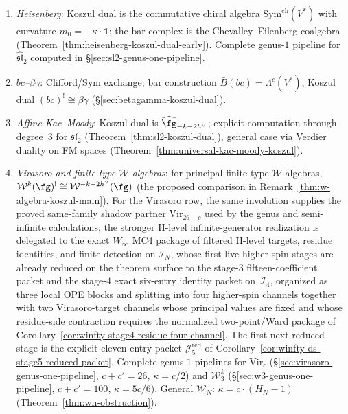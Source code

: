 \begin{enumerate}[label=(\roman*)]
\item \emph{Heisenberg}: Koszul dual is the commutative chiral algebra
$\mathrm{Sym}^{\mathrm{ch}}(V^*)$ with curvature $m_0 = -\kappa \cdot \mathbf{1}$;
the bar complex is the Chevalley--Eilenberg coalgebra
(Theorem~\ref{thm:heisenberg-koszul-dual-early}).
Complete genus-$1$ pipeline for $\widehat{\mathfrak{sl}}_2$ computed
in \S\ref{sec:sl2-genus-one-pipeline}.
\item \emph{$bc$--$\beta\gamma$}: Clifford/Sym exchange;
bar construction $\bar{B}(bc) = \Lambda^c(V^*)$, Koszul dual
$(bc)^! \cong \beta\gamma$
(\S\ref{sec:betagamma-koszul-dual}).
\item \emph{Affine Kac--Moody}: Koszul dual is
$\widehat{\fg}_{-k-2h^\vee}$; explicit computation through degree~$3$
for $\mathfrak{sl}_2$ (Theorem~\ref{thm:sl2-koszul-dual}),
general case via Verdier duality on FM spaces
(Theorem~\ref{thm:universal-kac-moody-koszul}).
\item \emph{Virasoro and finite-type $\mathcal{W}$-algebras}:
for principal finite-type $\mathcal{W}$-algebras,
$\mathcal{W}^k(\fg)^! \cong \mathcal{W}^{-k-2h^\vee}(\fg)$
(the proposed comparison in Remark~\ref{thm:w-algebra-koszul-main}).
For the Virasoro row, the same involution supplies the proved
same-family shadow partner $\mathrm{Vir}_{26-c}$ used by the
genus and semi-infinite calculations; the stronger H-level
infinite-generator realization is delegated to the exact
$W_\infty$ MC4 package of filtered H-level targets, residue identities,
and finite detection on $\mathcal{I}_N$, whose first live
higher-spin stages are already reduced on the theorem surface to the
stage-$3$ fifteen-coefficient packet and the stage-$4$
exact six-entry identity packet on~$\mathcal{I}_4$, organized as three
local OPE blocks and splitting into four higher-spin channels together
with two Virasoro-target channels whose principal values are fixed and
whose residue-side contraction requires the normalized two-point/Ward
package of Corollary~\ref{cor:winfty-stage4-residue-four-channel}.  The
first next reduced stage is the explicit eleven-entry packet
$\mathcal{J}_5^{\mathrm{red}}$ of
Corollary~\ref{cor:winfty-ds-stage5-reduced-packet}.
Complete genus-$1$ pipelines for $\mathrm{Vir}_c$
(\S\ref{sec:virasoro-genus-one-pipeline}, $c + c' = 26$, $\kappa = c/2$)
and $\mathcal{W}_3^k$
(\S\ref{sec:w3-genus-one-pipeline}, $c + c' = 100$, $\kappa = 5c/6$).
General $\mathcal{W}_N$: $\kappa = c \cdot (H_N - 1)$
(Theorem~\ref{thm:wn-obstruction}).
\end{enumerate}

